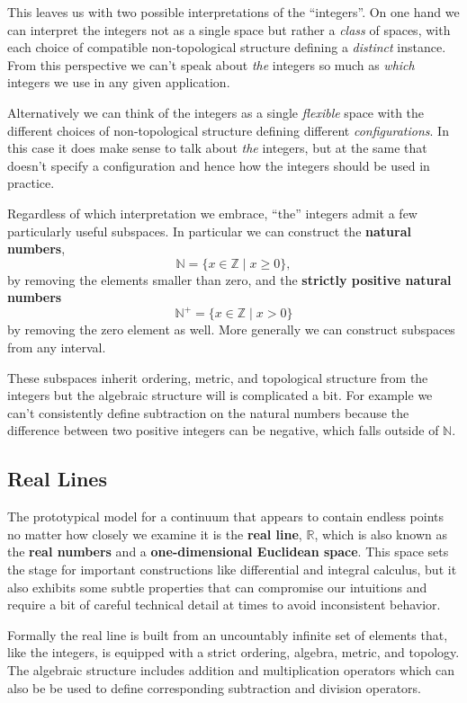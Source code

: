\documentclass[
  letterpaper,
  DIV=11,
  numbers=noendperiod]{scrartcl}
\begin{document}
This leaves us with two possible interpretations of the ``integers''. On
one hand we can interpret the integers not as a single space but rather
a \emph{class} of spaces, with each choice of compatible non-topological
structure defining a \emph{distinct} instance. From this perspective we
can't speak about \emph{the} integers so much as \emph{which} integers
we use in any given application.

Alternatively we can think of the integers as a single \emph{flexible}
space with the different choices of non-topological structure defining
different \emph{configurations}. In this case it does make sense to talk
about \emph{the} integers, but at the same that doesn't specify a
configuration and hence how the integers should be used in practice.

Regardless of which interpretation we embrace, ``the'' integers admit a
few particularly useful subspaces. In particular we can construct the
\textbf{natural numbers}, \[
\mathbb{N} = \{ x \in \mathbb{Z} \mid x \ge 0 \},
\] by removing the elements smaller than zero, and the \textbf{strictly
positive natural numbers} \[
\mathbb{N}^{+} = \{ x \in \mathbb{Z} \mid x > 0 \}
\] by removing the zero element as well. More generally we can construct
subspaces from any interval.

These subspaces inherit ordering, metric, and topological structure from
the integers but the algebraic structure will is complicated a bit. For
example we can't consistently define subtraction on the natural numbers
because the difference between two positive integers can be negative,
which falls outside of \(\mathbb{N}\).

\hypertarget{real-lines}{%
\subsection{Real Lines}\label{real-lines}}

The prototypical model for a continuum that appears to contain endless
points no matter how closely we examine it is the \textbf{real line},
\(\mathbb{R}\), which is also known as the \textbf{real numbers} and a
\textbf{one-dimensional Euclidean space}. This space sets the stage for
important constructions like differential and integral calculus, but it
also exhibits some subtle properties that can compromise our intuitions
and require a bit of careful technical detail at times to avoid
inconsistent behavior.

Formally the real line is built from an uncountably infinite set of
elements that, like the integers, is equipped with a strict ordering,
algebra, metric, and topology. The algebraic structure includes addition
and multiplication operators which can also be be used to define
corresponding subtraction and division operators.
\end{document}
